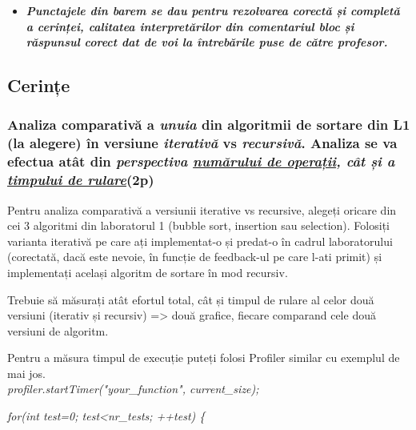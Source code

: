 \documentclass[../ro-fa-lab.tex]{subfiles}
\begin{document}
\begin{itemize}
\item
  \emph{\textbf{Punctajele din barem se dau pentru rezolvarea corectă și
  completă a cerinței, calitatea interpretărilor din comentariul bloc și
  răspunsul corect dat de voi la întrebările puse de către profesor.}}
\end{itemize}

\subsection{Cerințe}\label{cerinux21be}

\subsubsection{\texorpdfstring{Analiza comparativă a \emph{unuia} din
algoritmii de sortare din L1 (la alegere) în versiune \emph{iterativă}
vs \emph{recursivă}. Analiza se va efectua atât din \emph{perspectiva
\ul{numărului de operații}, cât și a \ul{timpului de rulare}}(2p)}{Analiza comparativă a unuia din algoritmii de sortare din L1 (la alegere) în versiune iterativă vs recursivă. Analiza se va efectua atât din perspectiva numărului de operații, cât și a timpului de rulare (2p)}}\label{analiza-comparativux103-a-unuia-din-algoritmii-de-sortare-din-l1-la-alegere-uxeen-versiune-iterativux103-vs-recursivux103.-analiza-se-va-efectua-atuxe2t-din-perspectiva-numux103rului-de-operaux21bii-cuxe2t-ux219i-a-timpului-de-rulare-2p}

Pentru analiza comparativă a versiunii iterative vs recursive, alegeți
oricare din cei 3 algoritmi din laboratorul 1 (bubble sort, insertion
sau selection). Folosiți varianta iterativă pe care ați implementat-o și
predat-o în cadrul laboratorului (corectată, dacă este nevoie, în
funcție de feedback-ul pe care l-ati primit) și implementați același
algoritm de sortare în mod recursiv.

Trebuie să măsurați atât efortul total, cât și timpul de rulare al celor
două versiuni (iterativ și recursiv) =\textgreater{} două grafice,
fiecare comparand cele două versiuni de algoritm.

Pentru a măsura timpul de execuție puteți folosi Profiler similar cu
exemplul de mai jos.
\\

\emph{profiler.startTimer("your\_function", current\_size);}

\emph{for(int test=0; test\textless nr\_tests; ++test) \{}
\end{document}
